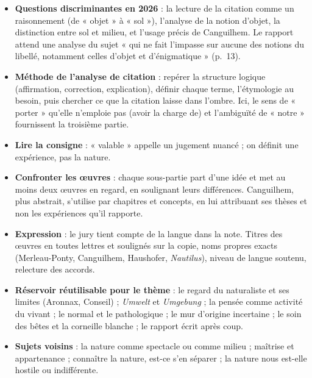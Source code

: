 \documentclass[11pt,a4paper]{article}
\providecommand{\tightlist}{\setlength{\itemsep}{0pt}\setlength{\parskip}{0pt}}
\begin{document}
\begin{itemize}
\tightlist
\item
  \textbf{Questions discriminantes en 2026} : la lecture de la citation comme un raisonnement (de « objet » à « sol »), l'analyse de la notion d'objet, la distinction entre sol et milieu, et l'usage précis de Canguilhem. Le rapport attend une analyse du sujet « qui ne fait l'impasse sur aucune des notions du libellé, notamment celles d'objet et d'énigmatique » (p.~13).
\item
  \textbf{Méthode de l'analyse de citation} : repérer la structure logique (affirmation, correction, explication), définir chaque terme, l'étymologie au besoin, puis chercher ce que la citation laisse dans l'ombre. Ici, le sens de « porter » qu'elle n'emploie pas (avoir la charge de) et l'ambiguïté de « notre » fournissent la troisième partie.
\item
  \textbf{Lire la consigne} : « valable » appelle un jugement nuancé ; on définit une expérience, pas la nature.
\item
  \textbf{Confronter les œuvres} : chaque sous-partie part d'une idée et met au moins deux œuvres en regard, en soulignant leurs différences. Canguilhem, plus abstrait, s'utilise par chapitres et concepts, en lui attribuant ses thèses et non les expériences qu'il rapporte.
\item
  \textbf{Expression} : le jury tient compte de la langue dans la note. Titres des œuvres en toutes lettres et soulignés sur la copie, noms propres exacts (Merleau-Ponty, Canguilhem, Haushofer, \emph{Nautilus}), niveau de langue soutenu, relecture des accords.
\item
  \textbf{Réservoir réutilisable pour le thème} : le regard du naturaliste et ses limites (Aronnax, Conseil) ; \emph{Umwelt} et \emph{Umgebung} ; la pensée comme activité du vivant ; le normal et le pathologique ; le mur d'origine incertaine ; le soin des bêtes et la corneille blanche ; le rapport écrit après coup.
\item
  \textbf{Sujets voisins} : la nature comme spectacle ou comme milieu ; maîtrise et appartenance ; connaître la nature, est-ce s'en séparer ; la nature nous est-elle hostile ou indifférente.
\end{itemize}
\end{document}
